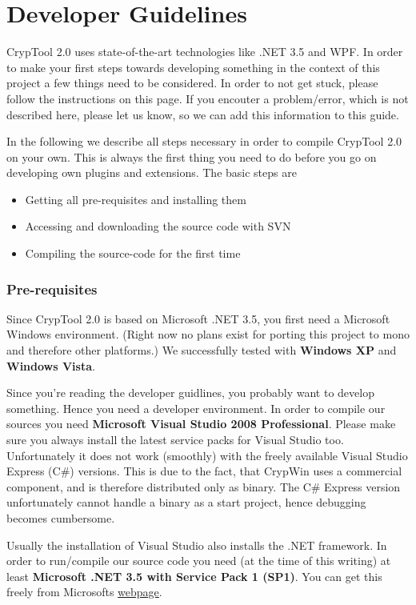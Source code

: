 \part{Developer Guidelines}

CrypTool 2.0 uses state-of-the-art technologies like .NET 3.5 and WPF. In order to make your first steps towards developing something in the context of this project a few things need to be considered. In order to not get stuck, please follow the instructions on this page. If you encouter a problem/error, which is not described here, please let us know, so we can add this information to this guide. 

In the following we describe all steps necessary in order to compile CrypTool 2.0 on your own. This is always the first thing you need to do before you go on developing own plugins and extensions. The basic steps are
\begin{itemize}
	\item Getting all pre-requisites and installing them 
	\item Accessing and downloading the source code with SVN 
	\item Compiling the source-code for the first time
\end{itemize}

\section{Pre-requisites}

Since CrypTool 2.0 is based on Microsoft .NET 3.5, you first need a Microsoft Windows environment. (Right now no plans exist for porting this project to mono and therefore other platforms.) We successfully tested with \textbf{Windows XP} and \textbf{Windows Vista}. 

Since you're reading the developer guidlines, you probably want to develop something. Hence you need a developer environment. In order to compile our sources you need \textbf{Microsoft Visual Studio 2008 Professional}. Please make sure you always install the latest service packs for Visual Studio too. Unfortunately it does not work (smoothly) with the freely available Visual Studio Express (C\#) versions. This is due to the fact, that CrypWin uses a commercial component, and is therefore distributed only as binary. The C\# Express version unfortunately cannot handle a binary as a start project, hence debugging becomes cumbersome. 

Usually the installation of Visual Studio also installs the .NET framework. In order to run/compile our source code you need (at the time of this writing) at least \textbf{Microsoft .NET 3.5 with Service Pack 1 (SP1)}. You can get this freely from Microsofts \href{http://download.microsoft.com/download/2/0/e/20e90413-712f-438c-988e-fdaa79a8ac3d/dotnetfx35.exe}{webpage}. 

